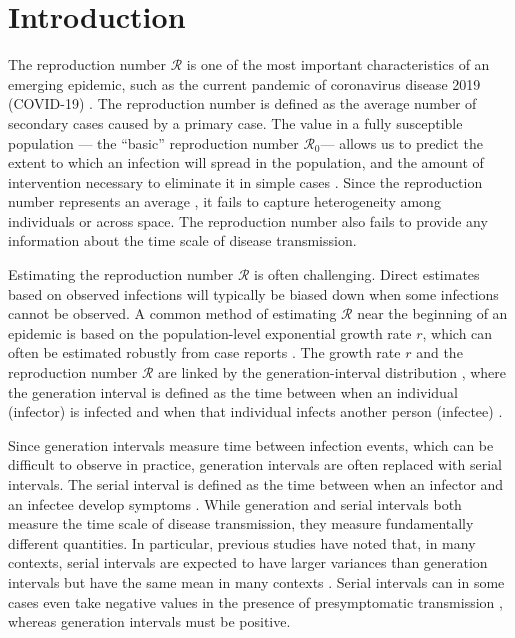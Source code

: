 \documentclass[12pt]{article}
\newcommand{\Rx}[1]{\ensuremath{{\mathcal R}_{#1}}\xspace}
\newcommand{\Ro}{\Rx{0}}
\newcommand{\RR}{\ensuremath{{\mathcal R}}\xspace}
\begin{document}
\pagebreak

\section{Introduction}

The reproduction number \RR is one of the most important characteristics of an emerging epidemic, such as the current pandemic of coronavirus disease 2019 (COVID-19) \citep{majumder2020early}.
The reproduction number is defined as the average number of secondary cases caused by a primary case.
The value in a fully susceptible population --- the ``basic'' reproduction number \Ro --- allows us to predict the extent to which an infection will spread in the population, and the amount of intervention necessary to eliminate it in simple cases \citep{anderson1991infectious}.
Since the reproduction number represents an average \citep{diekmann1990definition, anderson1991infectious}, it fails to capture heterogeneity among individuals or across space.
The reproduction number also fails to provide any information about the time scale of disease transmission.

Estimating the reproduction number \RR is often challenging.
Direct estimates based on observed infections will typically be biased down when some infections cannot be observed.
A common method of estimating \RR near the beginning of an epidemic is based on the population-level exponential growth rate $r$, which can often be estimated robustly from case reports \citep{mills2004transmissibility, ma2014estimating}.
The growth rate $r$ and the reproduction number \RR are linked by the generation-interval distribution \cite{wallinga2007generation}, where the generation interval is defined as the time between when an individual (infector) is infected and when that individual infects another person (infectee) \citep{svensson2007note}.

Since generation intervals measure time between infection events, which can be difficult to observe in practice, generation intervals are often replaced with serial intervals.
The serial interval is defined as the time between when an infector and an infectee develop symptoms \citep{svensson2007note}.
While generation and serial intervals both measure the time scale of disease transmission, they measure fundamentally different quantities. 
In particular, previous studies have noted that, in many contexts, serial intervals are expected to have larger variances than generation intervals but have the same mean in many contexts \citep{svensson2007note,klinkenberg2011correlation,te2013estimating,champredon2018equivalence}.
Serial intervals can in some cases even take negative values in the presence of presymptomatic transmission \citep{he2020temporal}, whereas generation intervals must be positive.
\end{document}
